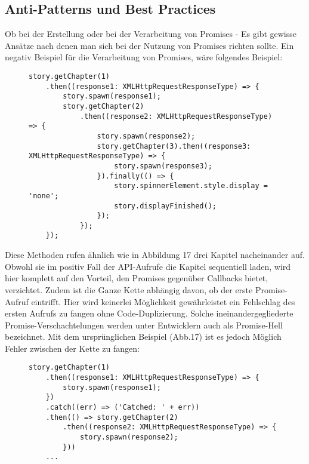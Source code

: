 \subsection{Anti-Patterns und Best Practices}

Ob bei der Erstellung oder bei der Verarbeitung von Promises - Es gibt gewisse Ansätze nach denen man sich bei der Nutzung von Promises richten sollte. Ein negativ Beispiel für die Verarbeitung von Promises, wäre folgendes Beispiel:

\begin{figure}[H]
\begin{lstlisting}
story.getChapter(1)
    .then((response1: XMLHttpRequestResponseType) => {
        story.spawn(response1);
        story.getChapter(2)
            .then((response2: XMLHttpRequestResponseType) => {
                story.spawn(response2);
                story.getChapter(3).then((response3: XMLHttpRequestResponseType) => {
                    story.spawn(response3);
                }).finally(() => {
                    story.spinnerElement.style.display = 'none';
                    story.displayFinished();
                });
            });
    });
\end{lstlisting}
\end{figure}

\noindent
Diese Methoden rufen ähnlich wie in Abbildung 17 drei Kapitel nacheinander auf. Obwohl sie im positiv Fall der API-Aufrufe die Kapitel sequentiell laden, wird hier komplett auf den Vorteil, den Promises gegenüber Callbacks bietet, verzichtet. Zudem ist die Ganze Kette abhängig davon, ob der erste Promise-Aufruf eintrifft. Hier wird keinerlei Möglichkeit gewährleistet ein Fehlschlag des ersten Aufrufs zu fangen ohne Code-Duplizierung. Solche ineinandergegliederte Promise-Verschachtelungen werden unter Entwicklern auch als \glqq{}Promise-Hell\grqq{} bezeichnet.
Mit dem ursprünglichen Beispiel (Abb.17) ist es jedoch Möglich Fehler zwischen der Kette zu fangen:

\begin{figure}[H]
\begin{lstlisting}
story.getChapter(1)
    .then((response1: XMLHttpRequestResponseType) => {
        story.spawn(response1);
    })
    .catch((err) => ('Catched: ' + err))
    .then(() => story.getChapter(2)
        .then((response2: XMLHttpRequestResponseType) => {
            story.spawn(response2);
        }))
    ...
    \end{lstlisting}
\end{figure}

